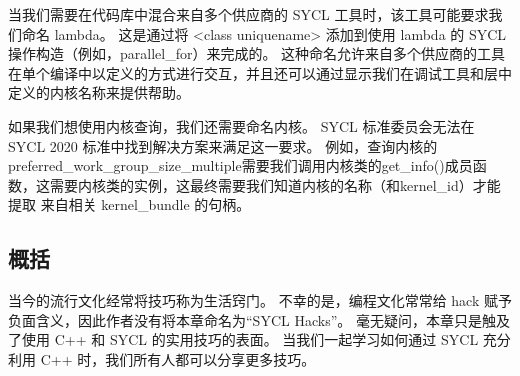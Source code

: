 当我们需要在代码库中混合来自多个供应商的 SYCL 工具时，该工具可能要求我们命名 lambda。 这是通过将 <class uniquename> 添加到使用 lambda 的 SYCL 操作构造（例如，parallel\_for）来完成的。 这种命名允许来自多个供应商的工具在单个编译中以定义的方式进行交互，并且还可以通过显示我们在调试工具和层中定义的内核名称来提供帮助。

如果我们想使用内核查询，我们还需要命名内核。 SYCL 标准委员会无法在 SYCL 2020 标准中找到解决方案来满足这一要求。 例如，查询内核的preferred\_work\_group\_size\_multiple需要我们调用内核类的get\_info()成员函数，这需要内核类的实例，这最终需要我们知道内核的名称（和kernel\_id）才能提取 来自相关 kernel\_bundle 的句柄。

\subsection{概括}
当今的流行文化经常将技巧称为生活窍门。 不幸的是，编程文化常常给 hack 赋予负面含义，因此作者没有将本章命名为“SYCL Hacks”。 毫无疑问，本章只是触及了使用 C++ 和 SYCL 的实用技巧的表面。 当我们一起学习如何通过 SYCL 充分利用 C++ 时，我们所有人都可以分享更多技巧。